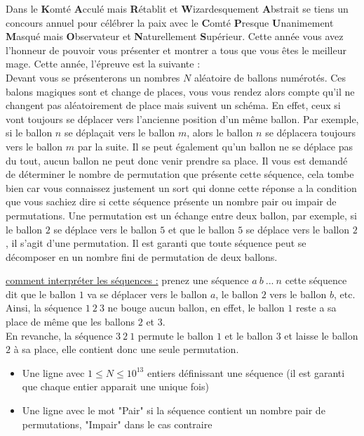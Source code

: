 \problemname{\problemyamlname}


Dans le \textbf{K}omté \textbf{A}cculé mais \textbf{R}établit et \textbf{W}izardesquement \textbf{A}bstrait se tiens un concours annuel pour célébrer la paix avec le \textbf{C}omté \textbf{P}resque \textbf{U}nanimement \textbf{M}asqué mais \textbf{O}bservateur et \textbf{N}aturellement \textbf{S}upérieur.
Cette année vous avez l'honneur de pouvoir vous présenter et montrer a tous que vous êtes le meilleur mage. Cette année, l'épreuve est la suivante : \\

Devant vous se présenterons un nombres $N$ aléatoire de ballons numérotés. Ces balons magiques sont et change de places, vous vous rendez alors compte qu'il ne changent pas aléatoirement de place mais suivent un schéma. En effet, ceux si vont toujours se déplacer vers l'ancienne position d'un même ballon.
Par exemple, si le ballon $n$ se déplaçait vers le ballon $m$, alors le ballon $n$ se déplacera toujours vers le ballon $m$ par la suite. Il se peut également qu'un ballon ne se déplace pas du tout, aucun ballon ne peut donc venir prendre sa place.
Il vous est demandé de déterminer le nombre de permutation que présente cette séquence, cela tombe bien car vous connaissez justement un sort qui donne cette réponse a la condition que vous sachiez dire si cette séquence présente un nombre pair ou impair de permutations.
Une permutation est un échange entre deux ballon, par exemple, si le ballon $2$ se déplace vers le ballon $5$ et que le ballon $5$ se déplace vers le ballon $2$, il s'agit d'une permutation.
Il est garanti que toute séquence peut se décomposer en un nombre fini de permutation de deux ballons.

\underline{comment interpréter les séquences :} prenez une séquence $a\ b\ ...\ n$ cette séquence dit que le ballon $1$ va se déplacer vers le ballon $a$, le ballon $2$ vers le ballon $b$, etc.\\
Ainsi, la séquence $1\ 2\ 3$ ne bouge aucun ballon, en effet, le ballon $1$ reste a sa place de même que les ballons $2$ et $3$.\\
En revanche, la séquence $3\ 2\ 1$ permute le ballon $1$ et le ballon $3$ et laisse le ballon $2$ à sa place, elle contient donc une seule permutation.

\begin{Input}
    \begin{itemize}
        \item Une ligne avec $1 \le N \le 10^{13}$ entiers définissant une séquence (il est garanti que chaque entier apparait une unique fois)
    \end{itemize}
\end{Input}

\begin{Output}
    \begin{itemize}
        \item Une ligne avec le mot "Pair" si la séquence contient un nombre pair de permutations, "Impair" dans le cas contraire
    \end{itemize}
\end{Output}